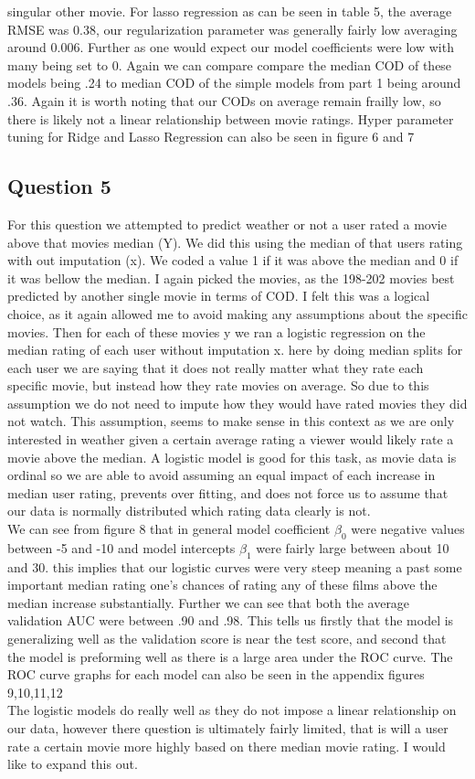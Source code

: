 \documentclass{article}
\begin{document}
singular other movie. For lasso regression as can be seen in table 5, the average RMSE was 0.38, our regularization parameter was generally fairly low averaging around 0.006. Further as one would expect our model coefficients were low with many being set to 0. Again we can compare compare the median COD of these models being .24 to median COD of the simple models from part 1 being around .36. Again it is worth noting that our CODs on average remain frailly low, so there is likely not a linear relationship between movie ratings. Hyper parameter tuning for Ridge and Lasso Regression can also be seen in figure 6 and 7



\subsection*{Question 5}
For this question we attempted to predict weather or not a user rated a movie above that movies median (Y). We did this using the median of that users rating with out imputation (x).
We coded a value 1 if it was above the median and 0 if it was bellow the median. I again picked the movies, as the 198-202 movies best predicted by another single movie in terms of COD. I felt this was a logical choice, as it again allowed me to avoid making any assumptions about the specific movies. Then for each of these movies y we ran a logistic regression on the median rating of each user without imputation x. here by doing median splits for each user we are saying that it does not really matter what they rate each specific movie, but instead how they rate movies on average. So due to this assumption we do not need to impute how they would have rated movies they did not watch. This assumption, seems to make sense in this context as we are only interested in weather given a certain average rating a viewer would likely rate a movie above the median. A logistic model is good for this task, as movie data is ordinal so we are able to avoid assuming an equal impact of each increase in median user rating, prevents over fitting, and does not force us to assume that our data is normally distributed which rating data clearly is not. \\ We can see from figure 8 that in general model coefficient $\beta_0$ were negative values between -5 and -10 and model intercepts $\beta_1$ were fairly large  between about 10 and 30. this implies that our logistic curves were very steep meaning a past some important median rating one's chances of rating any of these films above the median increase substantially. Further we can see that both the average validation AUC were between .90 and .98. This tells us firstly that the model is generalizing well as the validation score is near the test score, and second that the model is preforming well as there is a large area under the ROC curve. The ROC curve graphs for each model can also be seen in the appendix figures 9,10,11,12 
\\ The logistic models do really well as they do not impose a linear relationship on our data, however there question is ultimately fairly limited, that is will a user rate a certain movie more highly based on there median movie rating. I would like to expand this out. 
\end{document}
